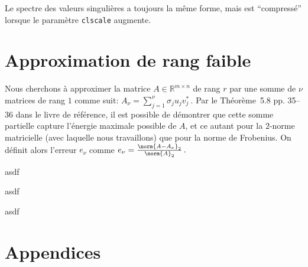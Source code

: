 \documentclass[11pt]{article}
\begin{document}
Le spectre des valeurs singulières a toujours la même forme,
mais est ``compressé'' lorsque le paramètre \texttt{clscale} augmente.

\section{Approximation de rang faible}
Nous cherchons à approximer la matrice $A \in \mathbb{R}^{m \times n}$ de rang $r$ par une somme de $\nu$ matrices de rang $1$ comme suit:
\(
A_{\nu} = \sum_{j=1}^{\nu} \sigma_{j} u_{j} v^*_{j}\,. 
\) 
Par le Théorème~5.8 pp. 35--36 dans le livre de référence, il est possible de démontrer que cette somme partielle capture l'énergie maximale possible de $A$, et ce autant pour la $2$-norme matricielle (avec laquelle nous travaillons) que pour la norme de Frobenius.
On définit alors l'erreur $e_{\nu}$ comme
\(
e_{\nu} = \frac{\norm{A - A_{\nu}}_2}{\norm{A}_2}\,.
\)

asdf

asdf

asdf

\appendix
\section*{Appendices}
\end{document}
